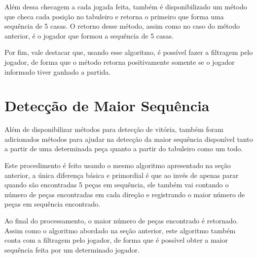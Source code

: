 \documentclass{article}
\begin{document}
    Além dessa checagem a cada jogada feita, também é disponibilizado um método
    que checa cada posição no tabuleiro e retorna o primeiro que forma uma
    sequência de 5 casas. O retorno desse método, assim como no caso do método
    anterior, é o jogador que formou a sequência de 5 casas.
    
    Por fim, vale destacar que, usando esse algoritmo, é possível fazer a
    filtragem pelo jogador, de forma que o método retorna positivamente somente
    se o jogador informado tiver ganhado a partida.
    
\section*{Detecção de Maior Sequência}
    Além de disponibilizar métodos para detecção de vitória, também foram
    adicionados métodos para ajudar na detecção da maior sequência disponível
    tanto a partir de uma determinada peça quanto a partir do tabuleiro como um
    todo. 
    
    Este procedimento é feito usando o mesmo algoritmo apresentado na seção
    anterior, a única diferença básica e primordial é que ao invés de apenas
    parar quando são encontradas 5 peças em sequência, ele também vai contando
    o número de peças encontradas em cada direção e registrando o maior número
    de peças em sequência encontrado.
    
    Ao final do processamento, o maior número de peças encontrado é retornado.
    Assim como o algoritmo abordado na seção anterior, este algoritmo também
    conta com a filtragem pelo jogador, de forma que é possível obter a maior
    sequência feita por um determinado jogador.
\end{document}

